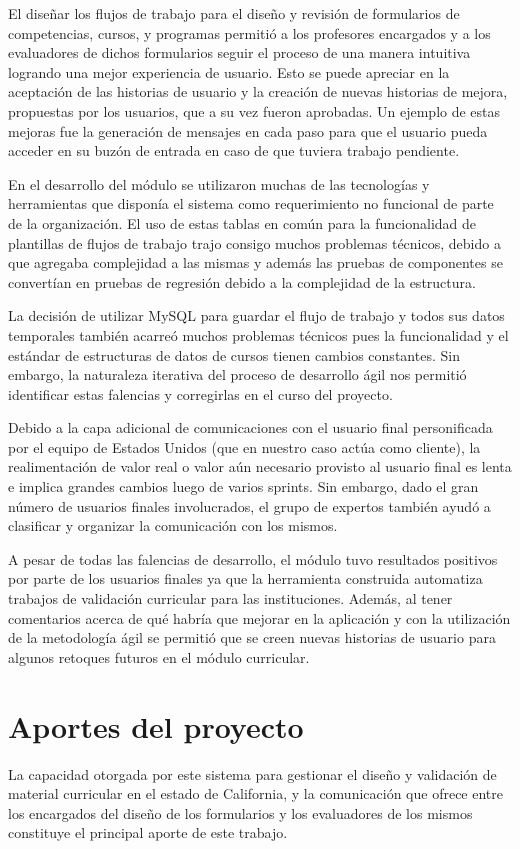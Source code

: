 El diseñar los flujos de trabajo para el diseño y revisión de formularios de competencias, cursos, y programas permitió a los profesores encargados y a los evaluadores de dichos formularios seguir el proceso de una manera intuitiva logrando una mejor experiencia de usuario. Esto se puede apreciar en la aceptación de las historias de usuario y la creación de nuevas historias de mejora, propuestas por los usuarios, que a su vez fueron aprobadas. Un ejemplo de estas mejoras fue la generación de mensajes en cada paso para que el usuario pueda acceder en su buzón de entrada en caso de que tuviera trabajo pendiente.

En el desarrollo del módulo se utilizaron muchas de las tecnologías y herramientas que disponía el sistema como requerimiento no funcional de parte de la organización. El uso de estas tablas en común para la funcionalidad de plantillas de flujos de trabajo trajo consigo muchos problemas técnicos, debido a que agregaba complejidad a las mismas y además las pruebas de componentes se convertían en pruebas de regresión debido a la complejidad de la estructura. 

La decisión de utilizar MySQL para guardar el flujo de trabajo y todos sus datos temporales también acarreó muchos problemas técnicos pues la funcionalidad y el estándar de estructuras de datos de cursos tienen cambios constantes. Sin embargo, la naturaleza iterativa del proceso de desarrollo ágil nos permitió identificar estas falencias y corregirlas en el curso del proyecto.

Debido a la capa adicional de comunicaciones con el usuario final personificada por el equipo de Estados Unidos (que en nuestro caso actúa como cliente), la realimentación de valor real o valor aún necesario provisto al usuario final es lenta e implica grandes cambios luego de varios sprints. Sin embargo, dado el gran número de usuarios finales involucrados, el grupo de expertos también ayudó a clasificar y organizar la comunicación con los mismos.

A pesar de todas las falencias de desarrollo, el módulo tuvo resultados positivos por parte de los usuarios finales ya que la herramienta construida automatiza trabajos de validación curricular para las instituciones. Además, al tener comentarios acerca de qué habría que mejorar en la aplicación y con la utilización de la metodología ágil se permitió que se creen nuevas historias de usuario para algunos retoques futuros en el módulo curricular. 

\section{Aportes del proyecto}
La capacidad otorgada por este sistema para gestionar el diseño y validación de material curricular en el estado de California, y la comunicación que ofrece entre los encargados del diseño de los formularios y los evaluadores de los mismos constituye el principal aporte de este trabajo.

